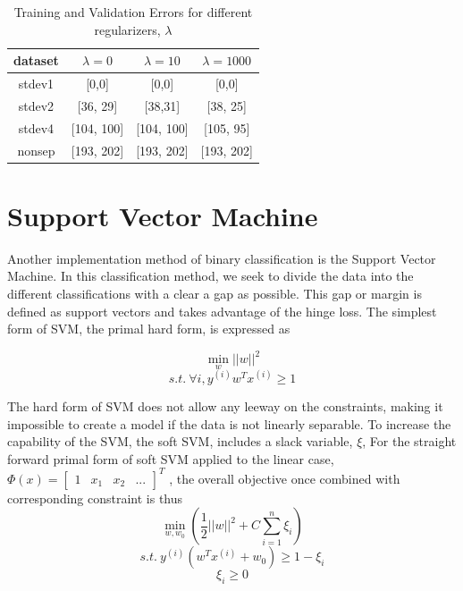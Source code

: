 \documentclass[10pt,twocolumn]{article}
\begin{document}
 \begin{table}
 \caption{ Training and Validation Errors for different regularizers, $\lambda$}
  \begin{tabular}{ | c | c | c | c |}
 \hline
 dataset &$ \lambda=0 $& $\lambda=10$ & $\lambda=1000$ \\ \hline 
 stdev1 & [0,0] & [0,0] & [0,0] \\ \hline
 stdev2 & [36, 29] & [38,31] & [38, 25] \\ \hline
 stdev4 & [104, 100] & [104, 100] & [105, 95] \\ \hline 
 nonsep & [193, 202] & [193, 202] & [193, 202] \\ \hline
 \end{tabular}
 \label{LR error}
\end{table}
 
 
 
 \section{Support Vector Machine}
 
 Another implementation method of binary classification is the Support Vector Machine. In this classification method, we seek to divide the data into the different classifications with a clear a gap as possible. This gap or margin is defined as support vectors and takes advantage of the hinge loss.  The simplest form of SVM, the primal hard form, is expressed as 

 \begin{equation}
\min_w ||w||^2
\end{equation}
\begin{equation}
s.t. \: \forall i, y^{(i)}w^T x^{(i)} \geq 1 
 \end{equation}
    
 The hard form of SVM does not allow any leeway on the constraints, making it impossible to create a model if the data is not linearly separable. To increase the capability of the SVM, the soft SVM, includes a slack variable, $\xi$, For the straight forward primal form of soft SVM applied to the linear case,  $\Phi(x)= \begin{bmatrix} 1 & x _1 & x_2 & ... \end{bmatrix}^T$ , the overall objective once combined with corresponding constraint is thus
 \begin{equation}
 \min_{w, w_0} (\frac{1}{2} ||w||^2 + C \sum_{i=1}^n \xi_i)
 \end{equation}
 \begin{equation}
 s.t. \: y^{(i)}(w^Tx^{(i)} + w_0) \geq 1 -\xi_i
 \end{equation}   
 \begin{equation}
 \xi_i \geq 0
 \end{equation}
    
\end{document}
